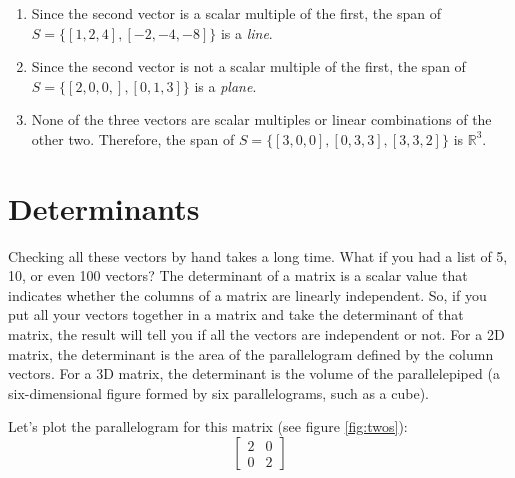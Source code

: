 \begin{Answer}[ref = span1]
\begin{enumerate}
\item Since the second vector is a scalar multiple of the first, the span of 
$S = \{ \left[1, 2, 4 \right], \left[-2, -4, -8 \right] \}$ is a \textit{line}.
\item Since the second vector is not a scalar multiple of the first, the span 
of $S = \{ \left[2, 0, 0, \right], \left[0, 1, 3 \right] \}$ is a 
\textit{plane}.
\item None of the three vectors are scalar multiples or linear combinations of 
the other two. Therefore, the span of $S = \{ \left[3, 0, 0 \right], \left[ 0, 
3, 3 \right], \left[3, 3, 2 \right] \}$ is $\mathbb{R}^3$.
\end{enumerate}
\end{Answer}


\section{Determinants}
Checking all these vectors by hand takes a long time. What if you had a list 
of 5, 10, or even 100 vectors? The determinant of a matrix is a scalar value 
that indicates whether the columns of a matrix are linearly independent. So, 
if you put all your vectors together in a matrix and take the determinant of 
that matrix, the result will tell you if all the vectors are independent or 
not. For a 2D matrix, the determinant is the area of the parallelogram defined 
by the column vectors. For a 3D matrix, the determinant is the volume of the 
parallelepiped (a six-dimensional figure formed by six parallelograms, such as 
a cube). 

Let's plot the parallelogram for this matrix (see figure \ref{fig:twos}):
$$
\begin{bmatrix}
2 & 0  \\
0 & 2 
\end{bmatrix}
$$

